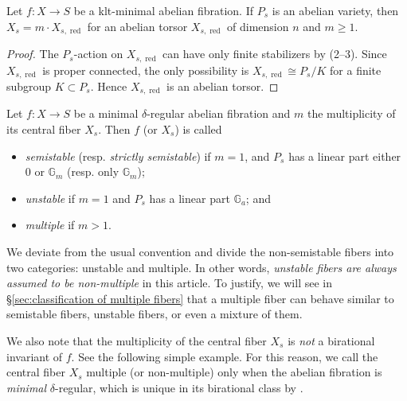 \documentclass[reqno, letterpaper]{amsart}
\numberwithin{equation}{subsection}
\let\to\longrightarrow
\newcommand{\GG}{\mathbb{G}}
\DeclareMathOperator{\red}{red}
\begin{document}
		\begin{lemma} \label{lem:classification when P is smooth}
			Let $f : X \to S$ be a klt-minimal abelian fibration. If $P_s$ is an abelian variety, then $X_s = m \cdot X_{s, \red}$ for an abelian torsor $X_{s, \red}$ of dimension $n$ and $m \ge 1$.
		\end{lemma}
		\begin{proof}
			The $P_s$-action on $X_{s, \red}$ can have only finite stabilizers by (2--3). Since $X_{s, \red}$ is proper connected, the only possibility is $X_{s, \red} \cong P_s / K$ for a finite subgroup $K \subset P_s$. Hence $X_{s, \red}$ is an abelian torsor.
		\end{proof}
		
		\begin{definition} \label{def:semistability}
			Let $f : X \to S$ be a minimal $\delta$-regular abelian fibration and $m$ the multiplicity of its central fiber $X_s$. Then $f$ (or $X_s$) is called
			\begin{itemize}
				\item \emph{semistable} (resp. \emph{strictly semistable}) if $m = 1$, and $P_s$ has a linear part either $0$ or $\GG_m$ (resp. only $\GG_m$);
				\item \emph{unstable} if $m = 1$ and $P_s$ has a linear part $\GG_a$; and
				\item \emph{multiple} if $m > 1$.
			\end{itemize}
		\end{definition}
		
		\begin{remark}
			We deviate from the usual convention and divide the non-semistable fibers into two categories: unstable and multiple. In other words, \emph{unstable fibers are always assumed to be non-multiple} in this article. To justify, we will see in \S \ref{sec:classification of multiple fibers} that a multiple fiber can behave similar to semistable fibers, unstable fibers, or even a mixture of them.
			
			We also note that the multiplicity of the central fiber $X_s$ is \emph{not} a birational invariant of $f$. See the following simple example. For this reason, we call the central fiber $X_s$ multiple (or non-multiple) only when the abelian fibration is \emph{minimal} $\delta$-regular, which is unique in its birational class by .
		\end{remark}
		
\end{document}
